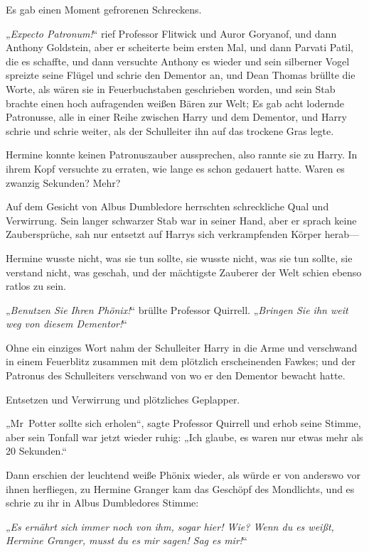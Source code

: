Es gab einen Moment gefrorenen Schreckens.

„\emph{Expecto Patronum!}“ rief Professor Flitwick und Auror Goryanof, und dann Anthony Goldstein, aber er scheiterte beim ersten Mal, und dann Parvati Patil, die es schaffte, und dann versuchte Anthony es wieder und sein silberner Vogel spreizte seine Flügel und schrie den Dementor an, und Dean Thomas brüllte die Worte, als wären sie in Feuerbuchstaben geschrieben worden, und sein Stab brachte einen hoch aufragenden weißen Bären zur Welt; Es gab acht lodernde Patronusse, alle in einer Reihe zwischen Harry und dem Dementor, und Harry schrie und schrie weiter, als der Schulleiter ihn auf das trockene Gras legte.

Hermine konnte keinen Patronuszauber aussprechen, also rannte sie zu Harry. In ihrem Kopf versuchte zu erraten, wie lange es schon gedauert hatte. Waren es zwanzig Sekunden? Mehr?

Auf dem Gesicht von Albus Dumbledore herrschten schreckliche Qual und Verwirrung. Sein langer schwarzer Stab war in seiner Hand, aber er sprach keine Zaubersprüche, sah nur entsetzt auf Harrys sich verkrampfenden Körper herab—

Hermine wusste nicht, was sie tun sollte, sie wusste nicht, was sie tun sollte, sie verstand nicht, was geschah, und der mächtigste Zauberer der Welt schien ebenso ratlos zu sein.

„\emph{Benutzen Sie Ihren Phönix!}“ brüllte Professor Quirrell. „\emph{Bringen Sie ihn weit weg von diesem Dementor!}“

Ohne ein einziges Wort nahm der Schulleiter Harry in die Arme und verschwand in einem Feuerblitz zusammen mit dem plötzlich erscheinenden Fawkes; und der Patronus des Schulleiters verschwand von wo er den Dementor bewacht hatte.

Entsetzen und Verwirrung und plötzliches Geplapper.

„Mr~Potter sollte sich erholen“, sagte Professor Quirrell und erhob seine Stimme, aber sein Tonfall war jetzt wieder ruhig: „Ich glaube, es waren nur etwas mehr als 20 Sekunden.“

Dann erschien der leuchtend weiße Phönix wieder, als würde er von anderswo vor ihnen herfliegen, zu Hermine Granger kam das Geschöpf des Mondlichts, und es schrie zu ihr in Albus Dumbledores Stimme:

„\emph{Es ernährt sich immer noch von ihm, sogar hier! Wie? Wenn du es weißt, Hermine Granger, musst du es mir sagen! Sag es mir!}“

